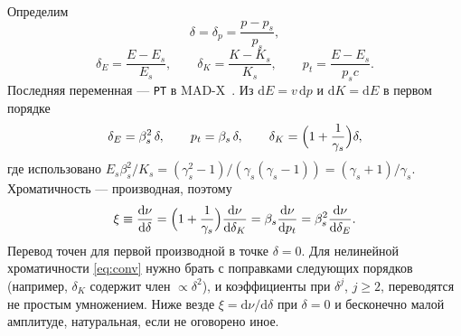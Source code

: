 Определим
\begin{equation}
\label{eq:dp}
\delta=\delta_p=\frac{p-p_s}{p_s},
\end{equation}
\begin{equation}
\label{eq:dE-dK}
\delta_E=\frac{E-E_s}{E_s},
\qquad
\delta_K=\frac{K-K_s}{K_s},
\qquad
p_t=\frac{E-E_s}{p_sc}.
\end{equation}
Последняя переменная --- \texttt{PT} в MAD-X~\cite{MADX}. Из $\mathrm{d}E=v\,\mathrm{d}p$ и $\mathrm{d}K=\mathrm{d}E$ в первом порядке
\begin{equation}
\label{eq:conv}
\delta_E=\beta_s^2\,\delta,
\qquad
p_t=\beta_s\,\delta,
\qquad
\delta_K=\Bigl(1+\frac{1}{\gamma_s}\Bigr)\delta,
\end{equation}
где использовано $E_s\beta_s^2/K_s=(\gamma_s^2-1)/(\gamma_s(\gamma_s-1))=(\gamma_s+1)/\gamma_s$. Хроматичность --- производная, поэтому
\begin{equation}
\label{eq:xi-conv}
\xi\equiv\frac{\mathrm{d}\nu}{\mathrm{d}\delta}
=\Bigl(1+\frac{1}{\gamma_s}\Bigr)\frac{\mathrm{d}\nu}{\mathrm{d}\delta_K}
=\beta_s\frac{\mathrm{d}\nu}{\mathrm{d}p_t}
=\beta_s^2\frac{\mathrm{d}\nu}{\mathrm{d}\delta_E}.
\end{equation}
Перевод точен для первой производной в точке $\delta=0$. Для нелинейной хроматичности \eqref{eq:conv} нужно брать с поправками следующих порядков (например, $\delta_K$ содержит член $\propto\delta^2$), и коэффициенты при $\delta^j$, $j\ge2$, переводятся не простым умножением. Ниже везде $\xi=\mathrm{d}\nu/\mathrm{d}\delta$ при $\delta=0$ и бесконечно малой амплитуде, натуральная, если не оговорено иное.

